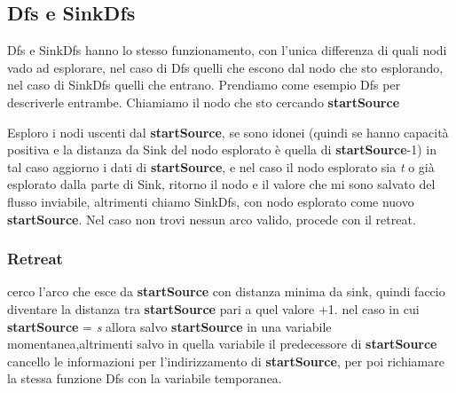 \documentclass{article}
\begin{document}
\subsection{Dfs e SinkDfs}

Dfs e SinkDfs hanno lo stesso funzionamento, con l'unica differenza di quali nodi vado ad esplorare, nel caso di Dfs quelli che escono dal nodo che sto esplorando, nel caso di SinkDfs quelli che entrano.
Prendiamo come esempio Dfs per descriverle entrambe.
Chiamiamo il nodo che sto cercando \textbf{startSource}

Esploro i nodi uscenti dal \textbf{startSource}, se sono idonei (quindi se hanno capacità positiva e la distanza da Sink del nodo esplorato è quella di \textbf{startSource}-1)
in tal caso aggiorno i dati di \textbf{startSource}, e nel caso il nodo esplorato  sia \textit{t} o già esplorato dalla parte di Sink, ritorno il nodo e il valore che mi sono salvato del flusso inviabile, altrimenti chiamo SinkDfs, con nodo esplorato come nuovo \textbf{startSource}.
Nel caso non trovi nessun arco valido, procede con il retreat.

\subsubsection{Retreat}

cerco l'arco che esce da \textbf{startSource} con distanza minima da sink, quindi faccio diventare la distanza tra \textbf{startSource} pari a quel valore +1.
nel caso in cui \textbf{startSource} = \textit{s} allora salvo \textbf{startSource} in una variabile momentanea,altrimenti salvo in quella variabile il predecessore di \textbf{startSource}
cancello le informazioni per l'indirizzamento di \textbf{startSource}, per poi richiamare la stessa funzione Dfs con la variabile temporanea.
\end{document}
